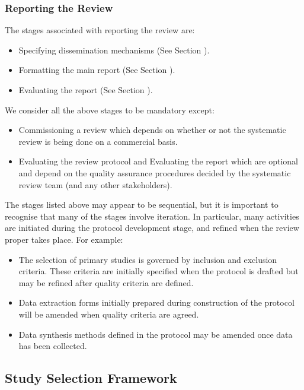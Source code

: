 \subsubsection{Reporting the Review}
The stages associated with reporting the review are:
\begin{itemize}
	\item Specifying dissemination mechanisms (See Section ).
	\item Formatting the main report (See Section ).
	\item Evaluating the report (See Section ).
\end{itemize}

We consider all the above stages to be mandatory except:
\begin{itemize}
	\item Commissioning a review which depends on whether or not the systematic review is being done on a
	      commercial basis.
	\item Evaluating the review protocol and Evaluating the report which are optional and depend on the
	      quality assurance procedures decided by the systematic review team (and any other stakeholders).
\end{itemize}

The stages listed above may appear to be sequential, but it is important to recognise that many of
the stages involve iteration. In particular, many activities are initiated during the protocol
development stage, and refined when the review proper takes place. For example:
\begin{itemize}
	\item The selection of primary studies is governed by inclusion and exclusion criteria. These criteria
	      are initially specified when the protocol is drafted but may be refined after quality criteria are
	      defined.
	\item Data extraction forms initially prepared during construction of the protocol will be amended when
	      quality criteria are agreed.
	\item Data synthesis methods defined in the protocol may be amended once data has been collected.
\end{itemize}

\subsection{Study Selection Framework}
\label{sec:study-selection}

